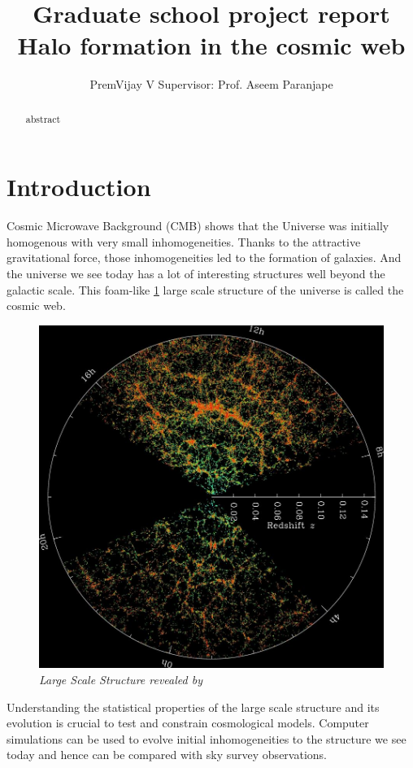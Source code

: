 \documentclass[12pt]{article}
\title{Graduate school project report\\
	Halo formation in the cosmic web}
\author{ PremVijay V \qquad Supervisor: Prof. Aseem Paranjape}
\begin{document}
\maketitle


\begin{abstract}
abstract
\end{abstract}

\section{Introduction}
Cosmic Microwave Background (CMB) shows that the Universe was initially homogenous with very small inhomogeneities. Thanks to the attractive gravitational force, those inhomogeneities led to the formation of galaxies. And the universe we see today has a lot of interesting structures well beyond the galactic scale. This foam-like \ref{fig:orangepie} large scale structure of the universe is called the cosmic web. 

\begin{figure}
\centering
\includegraphics[width=0.9\linewidth]{orangepie}
\caption{ \textit{Large Scale Structure revealed by \cite{cite_sdss}}}
\label{fig:orangepie}
\end{figure}

Understanding the statistical properties of the large scale structure and its evolution is crucial to test and constrain cosmological models. Computer simulations can be used to evolve initial inhomogeneities to the structure we see today and hence can be compared with sky survey observations.
\end{document}
